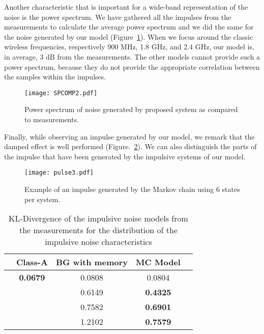 \documentclass[journal]{IEEEtran}
\begin{document}
Another characteristic that is important for a wide-band representation of the noise is the power spectrum. We have gathered all the impulses from the measurements to calculate the average power spectrum and we did the same for the noise generated by our model (Figure~\ref{spcomp}). When we focus around the classic wireless frequencies, respectively 900 MHz, 1.8 GHz, and 2.4 GHz, our model is, in average, 3 dB from the measurements. The other models cannot provide such a power spectrum, because they do not provide the appropriate correlation between the samples within the impulses.
\begin{figure}
\texttt{[image: SPCOMP2.pdf]}
  \caption{Power spectrum of noise generated by proposed system as compared to measurements.}\label{spcomp}
\end{figure}
Finally, while observing an impulse generated by our model, we remark that the damped effect is well performed (Figure.~\ref{impulse}). We can also distinguish the parts of the impulse that have been generated by the impulsive systems of our model.
\begin{center}
\begin{figure}
\texttt{[image: pulse3.pdf]}
  \caption{Example of an impulse generated by the Markov chain using 6 states per system.}\label{impulse}
\end{figure}
\end{center}

\begin{table}
  \centering
  \begin{tabular}{|c|c|c|c|c|}
   \hline
\centering{$-$} & Class-A & BG with memory & MC Model \\\hline
    \centering{Samples value} & \textbf{0.0679} & 0.0808 & 0.0804 \\\hline
    \centering{Impulse duration} & \centering{$-$}  & 0.6149 & \textbf{0.4325} \\\hline
    \centering{IAT} & \centering{$-$}  & 0.7582 & \textbf{0.6901} \\\hline
    \centering{Impulse amplitude} & \centering{$-$}  & 1.2102 & \textbf{0.7579} \\
    \hline
  \end{tabular}
  \caption{KL-Divergence of the impulsive noise models from the measurements for the distribution of the impulsive noise characteristics}\label{KLD}
\end{table}
\end{document}
